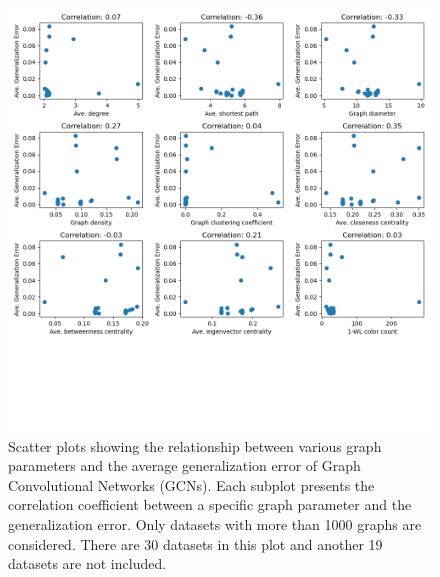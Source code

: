 \begin{figure}[H]
    \centering
    \includegraphics[width=\textwidth]{images/correlation_ignore_less_than_1000_GCN.png}
    \caption{Scatter plots showing the relationship between various graph parameters and the average generalization error of Graph Convolutional Networks (GCNs). Each subplot presents the correlation coefficient between a specific graph parameter and the generalization error. Only datasets with more than 1000 graphs are considered. There are 30 datasets in this plot and another 19 datasets are not included.}
    \label{fig:correlation_ignore_less_than_1000_GCN}
\end{figure}


